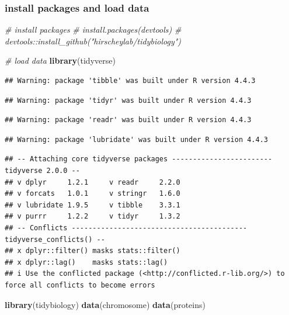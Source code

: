 \documentclass[
]{article}
\newenvironment{Shaded}{\begin{snugshade}}{\end{snugshade}}
\newcommand{\CommentTok}[1]{\textcolor[rgb]{0.56,0.35,0.01}{\textit{#1}}}
\newcommand{\FunctionTok}[1]{\textcolor[rgb]{0.13,0.29,0.53}{\textbf{#1}}}
\newcommand{\NormalTok}[1]{#1}
\newcommand{\StringTok}[1]{\textcolor[rgb]{0.31,0.60,0.02}{#1}}
\begin{document}
\subsubsection{install packages and load
data}\label{install-packages-and-load-data}

\begin{Shaded}
\begin{Highlighting}[]
\CommentTok{\# install packages}
\CommentTok{\# install.packages(\textquotesingle{}devtools\textquotesingle{})}
\CommentTok{\# devtools::install\_github("hirscheylab/tidybiology")}

\CommentTok{\# load data}
\FunctionTok{library}\NormalTok{(tidyverse)}
\end{Highlighting}
\end{Shaded}

\begin{verbatim}
## Warning: package 'tibble' was built under R version 4.4.3
\end{verbatim}

\begin{verbatim}
## Warning: package 'tidyr' was built under R version 4.4.3
\end{verbatim}

\begin{verbatim}
## Warning: package 'readr' was built under R version 4.4.3
\end{verbatim}

\begin{verbatim}
## Warning: package 'lubridate' was built under R version 4.4.3
\end{verbatim}

\begin{verbatim}
## -- Attaching core tidyverse packages ------------------------ tidyverse 2.0.0 --
## v dplyr     1.2.1     v readr     2.2.0
## v forcats   1.0.1     v stringr   1.6.0
## v lubridate 1.9.5     v tibble    3.3.1
## v purrr     1.2.2     v tidyr     1.3.2
## -- Conflicts ------------------------------------------ tidyverse_conflicts() --
## x dplyr::filter() masks stats::filter()
## x dplyr::lag()    masks stats::lag()
## i Use the conflicted package (<http://conflicted.r-lib.org/>) to force all conflicts to become errors
\end{verbatim}

\begin{Shaded}
\begin{Highlighting}[]
\FunctionTok{library}\NormalTok{(tidybiology)}
\FunctionTok{data}\NormalTok{(}\StringTok{\textquotesingle{}chromosome\textquotesingle{}}\NormalTok{)}
\FunctionTok{data}\NormalTok{(}\StringTok{\textquotesingle{}proteins\textquotesingle{}}\NormalTok{)}
\end{Highlighting}
\end{Shaded}
\end{document}
